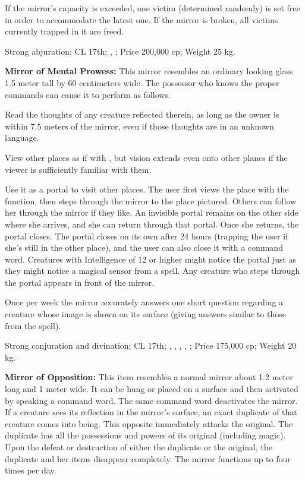 If the mirror's capacity is exceeded, one victim (determined randomly) is set free in order to accommodate the latest one. If the mirror is broken, all victims currently trapped in it are freed.

Strong abjuration; CL 17th; , ; Price 200,000 cp; Weight 25 kg.



\textbf{Mirror of Mental Prowess:} This mirror resembles an ordinary looking glass 1.5 meter tall by 60 centimeters wide. The possessor who knows the proper commands can cause it to perform as follows.

\begin{itemize*}
\item Read the thoughts of any creature reflected therein, as long as the owner is within 7.5 meters of the mirror, even if those thoughts are in an unknown language.
\item View other places as if with , but vision extends even onto other planes if the viewer is sufficiently familiar with them.
\item Use it as a portal to visit other places. The user first views the place with the  function, then steps through the mirror to the place pictured. Others can follow her through the mirror if they like. An invisible portal remains on the other side where she arrives, and she can return through that portal. Once she returns, the portal closes. The portal closes on its own after 24 hours (trapping the user if she's still in the other place), and the user can also close it with a command word. Creatures with Intelligence of 12 or higher might notice the portal just as they might notice a magical sensor from a  spell. Any creature who steps through the portal appears in front of the mirror.
\item Once per week the mirror accurately answers one short question regarding a creature whose image is shown on its surface (giving answers similar to those from the  spell).
\end{itemize*}


Strong conjuration and divination; CL 17th; , , , , ; Price 175,000 cp; Weight 20 kg.



\textbf{Mirror of Opposition:} This item resembles a normal mirror about 1.2 meter long and 1 meter wide. It can be hung or placed on a surface and then activated by speaking a command word. The same command word deactivates the mirror. If a creature sees its reflection in the mirror's surface, an exact duplicate of that creature comes into being. This opposite immediately attacks the original. The duplicate has all the possessions and powers of its original (including magic). Upon the defeat or destruction of either the duplicate or the original, the duplicate and her items disappear completely. The mirror functions up to four times per day.

